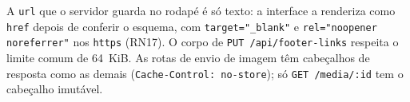 A \texttt{url} que o servidor guarda no rodapé é só texto: a interface a renderiza como \texttt{href} depois de conferir o esquema, com \texttt{target="\_blank"} e \texttt{rel="noopener noreferrer"} nos \texttt{https} (RN17). O corpo de \texttt{PUT /api/footer-links} respeita o limite comum de 64~KiB. As rotas de envio de imagem têm cabeçalhos de resposta como as demais (\texttt{Cache-Control: no-store}); só \texttt{GET /media/:id} tem o cabeçalho imutável.
